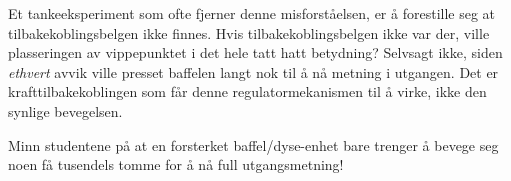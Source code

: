 Et tankeeksperiment som ofte fjerner denne misforståelsen, er å forestille seg at tilbakekoblingsbelgen ikke finnes. Hvis tilbakekoblingsbelgen ikke var der, ville plasseringen av vippepunktet i det hele tatt hatt betydning? Selvsagt ikke, siden {\it ethvert} avvik ville presset baffelen langt nok til å nå metning i utgangen. Det er krafttilbakekoblingen som får denne regulatormekanismen til å virke, ikke den synlige bevegelsen.

Minn studentene på at en forsterket baffel/dyse-enhet bare trenger å bevege seg noen få tusendels tomme for å nå full utgangsmetning!


